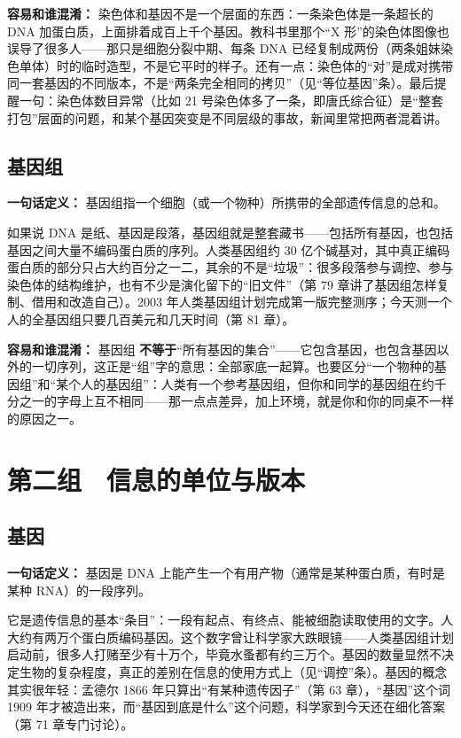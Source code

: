 \textbf{容易和谁混淆：} 染色体和基因不是一个层面的东西：一条染色体是一条超长的 DNA 加蛋白质，上面排着成百上千个基因。教科书里那个“X 形”的染色体图像也误导了很多人——那只是细胞分裂中期、每条 DNA 已经复制成两份（两条姐妹染色单体）时的临时造型，不是它平时的样子。还有一点：染色体的“对”是成对携带同一套基因的不同版本，不是“两条完全相同的拷贝”（见“等位基因”条）。最后提醒一句：染色体数目异常（比如 21 号染色体多了一条，即唐氏综合征）是“整套打包”层面的问题，和某个基因突变是不同层级的事故，新闻里常把两者混着讲。

\subsection{基因组}

\textbf{一句话定义：} 基因组指一个细胞（或一个物种）所携带的全部遗传信息的总和。

如果说 DNA 是纸、基因是段落，基因组就是整套藏书——包括所有基因，也包括基因之间大量不编码蛋白质的序列。人类基因组约 30 亿个碱基对，其中真正编码蛋白质的部分只占大约百分之一二，其余的不是“垃圾”：很多段落参与调控、参与染色体的结构维护，也有不少是演化留下的“旧文件”（第 79 章讲了基因组怎样复制、借用和改造自己）。2003 年人类基因组计划完成第一版完整测序；今天测一个人的全基因组只要几百美元和几天时间（第 81 章）。

\textbf{容易和谁混淆：} 基因组 \textbf{不等于}“所有基因的集合”——它包含基因，也包含基因以外的一切序列，这正是“组”字的意思：全部家底一起算。也要区分“一个物种的基因组”和“某个人的基因组”：人类有一个参考基因组，但你和同学的基因组在约千分之一的字母上互不相同——那一点点差异，加上环境，就是你和你的同桌不一样的原因之一。

\section{第二组　信息的单位与版本}

\subsection{基因}

\textbf{一句话定义：} 基因是 DNA 上能产生一个有用产物（通常是某种蛋白质，有时是某种 RNA）的一段序列。

它是遗传信息的基本“条目”：一段有起点、有终点、能被细胞读取使用的文字。人大约有两万个蛋白质编码基因。这个数字曾让科学家大跌眼镜——人类基因组计划启动前，很多人打赌至少有十万个，毕竟水蚤都有约三万个。基因的数量显然不决定生物的复杂程度，真正的差别在信息的使用方式上（见“调控”条）。基因的概念其实很年轻：孟德尔 1866 年只算出“有某种遗传因子”（第 63 章），“基因”这个词 1909 年才被造出来，而“基因到底是什么”这个问题，科学家到今天还在细化答案（第 71 章专门讨论）。

